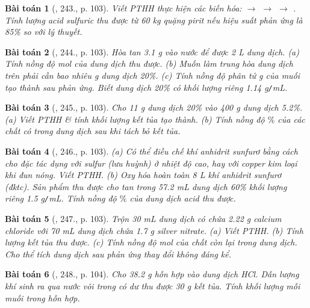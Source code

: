 \documentclass{article}
\newtheorem{baitoan}{Bài toán}
\begin{document}
\begin{baitoan}[\cite{Nguyen_Buu_Can_500_BT_Hoa_Hoc_THCS}, 243., p. 103]
	Viết {\rm PTHH} thực hiện các biến hóa: {\rm{} $\to$  $\to$  $\to$ }. Tính lượng acid sulfuric thu được từ {\rm60 kg} quặng pirit nếu hiệu suất phản ứng là {\rm85\%} so với lý thuyết.
\end{baitoan}

\begin{baitoan}[\cite{Nguyen_Buu_Can_500_BT_Hoa_Hoc_THCS}, 244., p. 103]
	Hòa tan {\rm3.1 g } vào nước để được {\rm2 L} dung dịch. (a) Tính nồng độ mol của dung dịch thu được. (b) Muốn làm trung hòa dung dịch trên phải cần bao nhiêu {\rm g} dung dịch {\rm{} 20\%}. (c) Tính nồng độ phân tử {\rm g} của muối tạo thành sau phản ứng. Biết dung dịch {\rm{} 20\%} có khối lượng riêng {\rm1.14 g{\tt/}mL}.
\end{baitoan}

\begin{baitoan}[\cite{Nguyen_Buu_Can_500_BT_Hoa_Hoc_THCS}, 245., p. 103]
	Cho {\rm11 g} dung dịch {\rm{} 20\%} vào {\rm400 g} dung dịch {\rm{} 5.2\%}. (a) Viết {\rm PTHH} \& tính khối lượng kết tủa tạo thành. (b) Tính nồng độ $\%$ của các chất có trong dung dịch sau khi tách bỏ kết tủa.
\end{baitoan}

\begin{baitoan}[\cite{Nguyen_Buu_Can_500_BT_Hoa_Hoc_THCS}, 246., p. 103]
	(a) Có thể điều chế khí anhidrit sunfurơ bằng cách cho {\rm{}} đặc tác dụng với sulfur (lưu huỳnh) ở nhiệt độ cao, hay với copper kim loại khi đun nóng. Viết {\rm PTHH}. (b) Oxy hóa hoàn toàn {\rm8 L} khí anhidrit sunfurơ {\rm{}} (đktc). Sản phẩm thu được cho tan trong {\rm57.2 mL} dung dịch {\rm{} 60\%} khối lượng riêng {\rm1.5 g{\tt/}mL}. Tính nồng độ $\%$ của dung dịch acid thu được.
\end{baitoan}

\begin{baitoan}[\cite{Nguyen_Buu_Can_500_BT_Hoa_Hoc_THCS}, 247., p. 103]
	Trộn {\rm30 mL} dung dịch có chứa {\rm2.22 g} calcium chloride với {\rm70 mL} dung dịch chứa {\rm1.7 g} silver nitrate. (a) Viết {\rm PTHH}. (b) Tính lượng kết tủa thu được. (c) Tính nồng độ mol của chất còn lại trong dung dịch. Cho thể tích dung dịch sau phản ứng thay đổi không đáng kể.
\end{baitoan}

\begin{baitoan}[\cite{Nguyen_Buu_Can_500_BT_Hoa_Hoc_THCS}, 248., p. 104]
	Cho {\rm38.2 g} hỗn hợp {\rm{}} vào dung dịch {\rm HCl}. Dẫn lượng khí sinh ra qua nước vôi trong có dư thu được {\rm30 g} kết tủa. Tính khối lượng mỗi muối trong hỗn hợp.
\end{baitoan}
\end{document}
